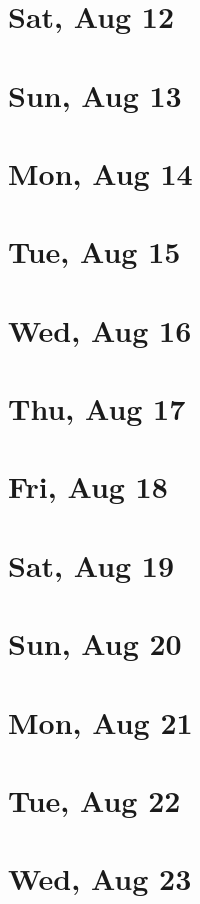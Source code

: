 	\section{Sat, Aug 12}
		
	\section{Sun, Aug 13}
		
	\section{Mon, Aug 14}
		
	\section{Tue, Aug 15}
		
	\section{Wed, Aug 16}
		
	\section{Thu, Aug 17}
		
	\section{Fri, Aug 18}
		
	\section{Sat, Aug 19}
		
	\section{Sun, Aug 20}
		
	\section{Mon, Aug 21}
		
	\section{Tue, Aug 22}
		
	\section{Wed, Aug 23}
		
